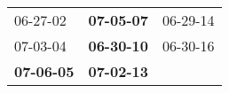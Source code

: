 \begin{supertabular}{p{0.33\columnwidth}p{0.33\columnwidth}p{0.33\columnwidth}}
          06-27-02\textsuperscript{} &  \textbf{07-05-07\textsuperscript{}} &  06-29-14\textsuperscript{} \\
          07-03-04\textsuperscript{} &  \textbf{06-30-10\textsuperscript{}} &  06-30-16\textsuperscript{} \\
 \textbf{07-06-05\textsuperscript{}} &  \textbf{07-02-13\textsuperscript{}} &                             \\
\end{supertabular}
